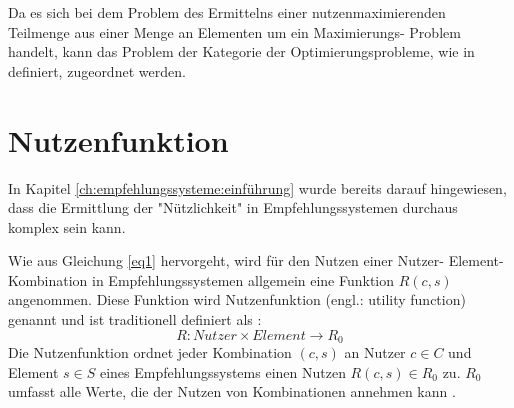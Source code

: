 Da es sich bei dem Problem des Ermittelns einer nutzenmaximierenden Teilmenge aus einer Menge an Elementen um ein Maximierungs- Problem handelt, kann das Problem der Kategorie der Optimierungsprobleme, wie in \textcite[S. 1]{book:kallrath} definiert, zugeordnet werden.

\section{Nutzenfunktion} %
\label{ch:empfehlungssysteme:nutzenfunktion}
In Kapitel \ref{ch:empfehlungssysteme:einführung} wurde bereits darauf hingewiesen, dass die Ermittlung der "Nützlichkeit" in Empfehlungssystemen durchaus komplex sein kann.

Wie aus Gleichung \ref{eq1} hervorgeht, wird für den Nutzen einer Nutzer- Element- Kombination in Empfehlungssystemen allgemein eine Funktion $R(c,s)$ angenommen.
Diese Funktion wird Nutzenfunktion (engl.: utility function) genannt und ist traditionell definiert als \cite[S. 195]{ricci:book}\cite[S. 3]{jawaheer:article}:
\begin{equation}\label{eq2}%
    R: Nutzer \times Element \rightarrow R_{0}
\end{equation}
Die Nutzenfunktion ordnet jeder Kombination $(c,s)$ an Nutzer $c \in C$ und Element $s \in S$ eines Empfehlungssystems einen Nutzen $R(c,s) \in R_{0}$ zu.
$R_{0}$ umfasst alle Werte, die der Nutzen von Kombinationen annehmen kann \cite[S. 49f]{adomavicius:inproceedings:2}.


